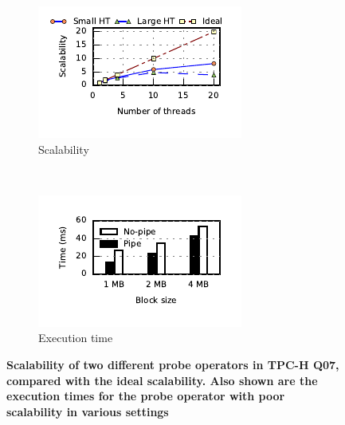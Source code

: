 \begin{figure}[ht]
	\centering
	\begin{subfigure}[ht]{0.48\textwidth}
		\includegraphics[width=\textwidth]{pipeline/figures/tpch-q07-sf50-probe-scalability}	
		\caption{Scalability}
		\label{fig:scalability-tpch-q07}
	\end{subfigure}
	~
	\begin{subfigure}[ht]{0.48\textwidth}
		\includegraphics[width=\textwidth]{pipeline/figures/scalability-impact-tpchq07-op9-performance}	
		\caption{Execution time}		
		\label{fig:scalability-tpch-q07-exec-times}
	\end{subfigure}
	\caption{\textbf{Scalability of two different probe operators in TPC-H Q07, compared with the ideal scalability. Also shown are the execution times for the probe operator with poor scalability in various settings}}
	\label{fig:scalability-plots}
\end{figure}

